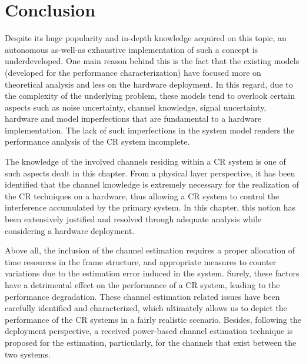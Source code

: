 {\section{Conclusion}
\label{sec:Con}
Despite its huge popularity and in-depth knowledge acquired on this topic, an autonomous as-well-as exhaustive implementation of such a concept is underdeveloped. One main reason behind this is the fact that the existing models (developed for the performance characterization) have focused more on theoretical analysis and less on the hardware deployment. In this regard, due to the complexity of the underlying problem, these models tend to overlook certain aspects such as noise uncertainty, channel knowledge, signal uncertainty, hardware and model imperfections that are fundamental to a hardware implementation. The lack of such imperfections in the system model renders the performance analysis of the CR system incomplete. 

The knowledge of the involved channels residing within a CR system is one of such aspects dealt in this chapter.
From a physical layer perspective, it has been identified that the channel knowledge is extremely necessary for the realization of the CR techniques on a hardware, thus allowing a CR system to control the interference accumulated by the primary system. In this chapter, this notion has been extensively justified and resolved through adequate analysis while considering a hardware deployment. %

Above all, the inclusion of the channel estimation requires a proper allocation of time resources in the frame structure, and appropriate measures to counter variations due to the estimation error induced in the system. Surely, these factors have a detrimental effect on the performance of a CR system, leading to the performance degradation. These channel estimation related issues have been carefully identified and characterized, which ultimately allows us to depict the performance of the CR systems in a fairly realistic scenario. Besides, following the deployment perspective, a received power-based channel estimation technique is proposed for the estimation, particularly, for the channels that exist between the two systems.

}
